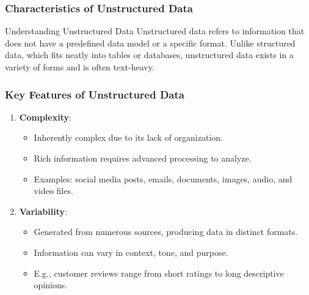 \documentclass{beamer}
\begin{document}
\begin{frame}[fragile]
    \frametitle{Characteristics of Unstructured Data}
    \begin{block}{Understanding Unstructured Data}
        Unstructured data refers to information that does not have a predefined data model or a specific format. Unlike structured data, which fits neatly into tables or databases, unstructured data exists in a variety of forms and is often text-heavy.
    \end{block}
\end{frame}

\begin{frame}[fragile]
    \frametitle{Key Features of Unstructured Data}
    \begin{enumerate}
        \item \textbf{Complexity}:
        \begin{itemize}
            \item Inherently complex due to its lack of organization.
            \item Rich information requires advanced processing to analyze.
            \item Examples: social media posts, emails, documents, images, audio, and video files.
        \end{itemize}
        \item \textbf{Variability}:
        \begin{itemize}
            \item Generated from numerous sources, producing data in distinct formats.
            \item Information can vary in context, tone, and purpose.
            \item E.g., customer reviews range from short ratings to long descriptive opinions.
        \end{itemize}
    \end{enumerate}
\end{frame}
\end{document}
